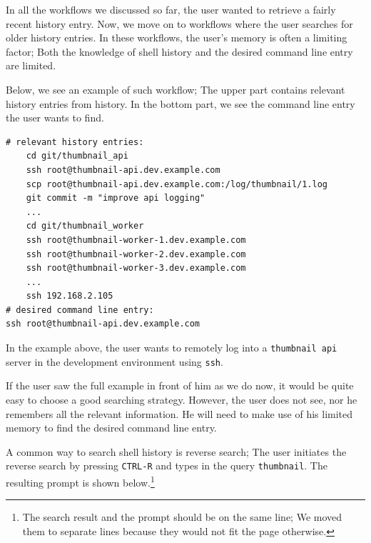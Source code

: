 In all the workflows we discussed so far, the user wanted to retrieve a fairly recent history entry. Now, we move on to workflows where the user searches for older history entries. In these workflows, the user's memory is often a limiting factor; Both the knowledge of shell history and the desired command line entry are limited.

Below, we see an example of such workflow; The upper part contains relevant history entries from history. In the bottom part, we see the command line entry the user wants to find. 



\begin{verbatim}
# relevant history entries:
    cd git/thumbnail_api
    ssh root@thumbnail-api.dev.example.com
    scp root@thumbnail-api.dev.example.com:/log/thumbnail/1.log
    git commit -m "improve api logging"
    ...
    cd git/thumbnail_worker
    ssh root@thumbnail-worker-1.dev.example.com
    ssh root@thumbnail-worker-2.dev.example.com
    ssh root@thumbnail-worker-3.dev.example.com
    ...
    ssh 192.168.2.105
# desired command line entry:
ssh root@thumbnail-api.dev.example.com
\end{verbatim}

In the example above, the user wants to remotely log into a \verb|thumbnail api| server in the development environment using \verb|ssh|. 

If the user saw the full example in front of him as we do now, it would be quite easy to choose a good searching strategy. However, the user does not see, nor he remembers all the relevant information. He will need to make use of his limited memory to find the desired command line entry. 

A common way to search shell history is reverse search; The user initiates the reverse search by pressing \verb|CTRL-R| and types in the query \verb|thumbnail|. The resulting prompt is shown below.\footnote{The search result and the prompt should be on the same line; We moved them to separate lines because they would not fit the page otherwise.}

